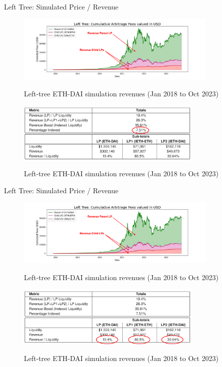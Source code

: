 \documentclass[10pt,xcolor=svgnames]{beamer} %
\begin{document}
\begin{frame}{Left Tree: Simulated Price / Revenue}

\begin{figure}[h!]
\includegraphics[width=3.8in]{img/arbitrage2.png}
\label{fig:simulation}
\caption{Left-tree ETH-DAI simulation revenues (Jan 2018 to Oct 2023)}
\end{figure}

\begin{figure}[h!]
\includegraphics[width=3.5in]{img/sim_revenues2.png}
\label{fig:simulation}
\caption{Left-tree ETH-DAI simulation revenues (Jan 2018 to Oct 2023)}
\end{figure}

\end{frame}

\begin{frame}{Left Tree: Simulated Price / Revenue}

\begin{figure}[h!]
\includegraphics[width=3.8in]{img/arbitrage2.png}
\label{fig:simulation}
\caption{Left-tree ETH-DAI simulation revenues (Jan 2018 to Oct 2023)}
\end{figure}

\begin{figure}[h!]
\includegraphics[width=3.5in]{img/sim_revenues3.png}
\label{fig:simulation}
\caption{Left-tree ETH-DAI simulation revenues (Jan 2018 to Oct 2023)}
\end{figure}

\end{frame}
\end{document}
